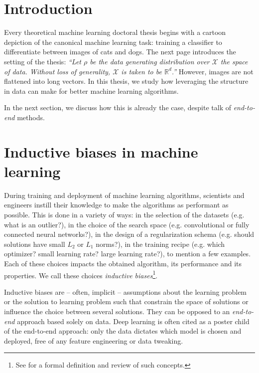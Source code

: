 
\section{Introduction}
Every theoretical machine learning doctoral thesis begins with a cartoon depiction of the canonical machine learning task: training a classifier to differentiate between images of cats and dogs. The next page introduces the setting of the thesis: \emph{``Let $\rho$ be the data generating distribution over $\mathcal X$ the space of data. Without loss of generality, $\mathcal X$ is taken to be $\mathbb R^d$.''} However, images are not flattened into long vectors. In this thesis, we study how leveraging the structure in data can make for better machine learning algorithms.

In the next section, we discuss how this is already the case, despite talk of \emph{end-to-end} methods.

\section{Inductive biases in machine learning}
During training and deployment of machine learning algorithms, scientists and engineers instill their knowledge to make the algorithms as performant as possible. This is done in a variety of ways: in the selection of the datasets (e.g. what is an outlier?), in the choice of the search space (e.g. convolutional or fully connected neural networks?), in the design of a regularization schema (e.g. should solutions have small $L_2$ or $L_1$ norms?), in the training recipe (e.g. which optimizer? small learning rate? large learning rate?), to mention a few examples. Each of these choices impacts the obtained algorithm, its performance and its properties. We call these choices \emph{inductive biases}\footnote{See \cite{mitchell-inductive,1806.01261} for a formal definition and review of such concepts.}.

Inductive biases are -- often, implicit -- assumptions about the learning problem or the solution to learning problem such that constrain the space of solutions or influence the choice between several solutions. They can be opposed to an \emph{end-to-end} approach based solely on data. Deep learning is often cited as a poster child of the end-to-end approach: only the data dictates which model is chosen and deployed, free of any feature engineering or data tweaking.

